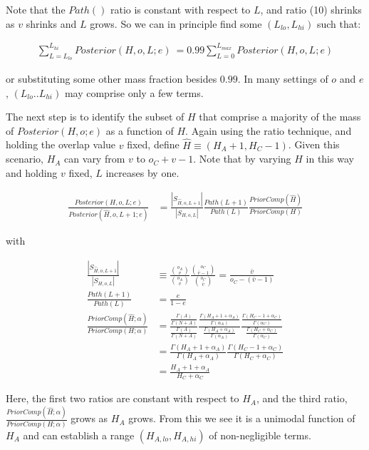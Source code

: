\documentclass{article}
\begin{document}
Note that the $Path()$ ratio is constant with respect to $L$, and
ratio (10) shrinks as $v$ shrinks and $L$ grows. So we can in
principle find some $(L_{lo},L_{hi})$ such that:

\begin{align}
  \sum_{L = L_{lo}}^{L_{hi}} Posterior(H,o,L;e) \>= 0.99 \sum_{L =
    0}^{L_{max}} Posterior(H,o,L;e)
\end{align}

or substituting some other mass fraction besides $0.99$. In many
settings of $o$ and $e$, $(L_{lo} .. L_{hi})$ may comprise only a few
terms.

The next step is to identify the subset of $H$ that comprise a
majority of the mass of $Posterior(H,o;e)$ as a function of $H$. Again
using the ratio technique, and holding the overlap value $v$ fixed,
define $\hat{H} \equiv (H_A + 1, H_C -1)$.  Given this scenario, $H_A$
can vary from $v$ to $o_C + v - 1$. Note that by varying $H$ in this
way and holding $v$ fixed, $L$ increases by one.

\begin{align}
  \frac{Posterior(H,o,L;e)}{Posterior(\hat{H},o,L+1;e)} & =
  \frac{|S_{\hat{H},o,L+1}|}{|S_{H,o,L}|}
  \frac{Path(L+1)}{Path(L)}
  \frac{PriorComp(\hat{H})}{PriorComp(H)} \nonumber  
\end{align}

with

\begin{align}
  \frac{|S_{\hat{H},o,L+1}|}{|S_{H,o,L}|}
  & \equiv
  \frac{{o_A \choose v}}{{o_A \choose v}}
  \frac{{o_C \choose {\bar{v}-1}}}{{o_C \choose \bar{v}}}
  =
  \frac{\bar{v}}{o_C - (\bar{v} - 1)} \\[3ex]
  \frac{Path(L+1)}{Path(L)}
  & =
  \frac{e}{1 - e} \\[3ex]
  \frac{PriorComp(\hat{H};\alpha)}{PriorComp(H;\alpha)} & =
  \frac{\frac{\Gamma(A)}{\Gamma(N+A)}}{\frac{\Gamma(A)}{\Gamma(N+A)}}
  \frac{ \frac{\Gamma(H_A+1+\alpha_A)}{\Gamma(\alpha_A)}}{
    \frac{\Gamma(H_A+\alpha_A)}{\Gamma(\alpha_A)} } \frac{
    \frac{\Gamma(H_C-1+\alpha_C)}{\Gamma(\alpha_C)} }{
    \frac{\Gamma(H_C+\alpha_C)}{\Gamma(\alpha_C)} } \nonumber \\[2ex]
  & =
  \frac{\Gamma(H_A + 1 + \alpha_A)}{\Gamma(H_A + \alpha_A)}
  \frac{\Gamma(H_C - 1 + \alpha_C)}{\Gamma(H_C + \alpha_C)} \nonumber \\[2ex]
  & =
  \frac{H_A + 1 + \alpha_A}{H_C + \alpha_C}
\end{align}

Here, the first two ratios are constant with respect to $H_A$, and the
third ratio, $\frac{PriorComp(\hat{H};\alpha)}{PriorComp(H;\alpha)}$
grows as $H_A$ grows. From this we see it is a unimodal function of
$H_A$ and can establish a range $(H_{A,lo},H_{A,hi})$ of
non-negligible terms.
\end{document}
